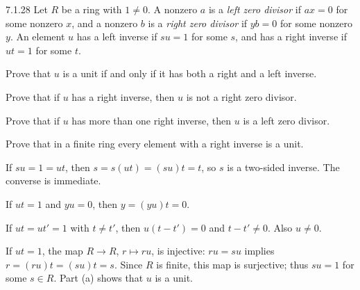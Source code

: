 \documentclass[11pt,oneside]{article}
\begin{document}
\begin{exercise}{7.1.28}
Let $R$ be a ring with $1\ne0$. A nonzero $a$ is a \emph{left zero divisor} if $ax=0$ for some nonzero $x$, and a nonzero $b$ is a \emph{right zero divisor} if $yb=0$ for some nonzero $y$. An element $u$ has a left inverse if $su=1$ for some $s$, and has a right inverse if $ut=1$ for some $t$.
\begin{exercisesubparts}
\item Prove that $u$ is a unit if and only if it has both a right and a left inverse.
\item Prove that if $u$ has a right inverse, then $u$ is not a right zero divisor.
\item Prove that if $u$ has more than one right inverse, then $u$ is a left zero divisor.
\item Prove that in a finite ring every element with a right inverse is a unit.
\end{exercisesubparts}
\end{exercise}
\begin{solution}
\begin{exercisesubparts}
\item If $su=1=ut$, then $s=s(ut)=(su)t=t$, so $s$ is a two-sided inverse. The converse is immediate.
\item If $ut=1$ and $yu=0$, then $y=(yu)t=0$.
\item If $ut=ut'=1$ with $t\ne t'$, then $u(t-t')=0$ and $t-t'\ne0$. Also $u\ne0$.
\item If $ut=1$, the map $R\to R$, $r\mapsto ru$, is injective: $ru=su$ implies $r=(ru)t=(su)t=s$. Since $R$ is finite, this map is surjective; thus $su=1$ for some $s\in R$. Part (a) shows that $u$ is a unit.
\end{exercisesubparts}
\end{solution}
\end{document}
